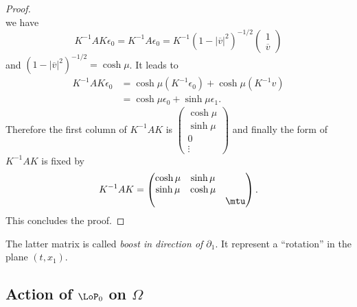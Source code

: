 \begin{proof}
\[\]
we have 
\[ 
  K^{-1}AK\epsilon_0=K^{-1}A\epsilon_0=K^{-1}(1-|\overline{v}|^2)^{-1/2}
\begin{pmatrix}
1\\\overline{v}
\end{pmatrix}
\]
and $(1-|\overline{v}|^2)^{-1/2}=\cosh\mu$. It leads to
\[ 
\begin{split}
K^{-1}AK\epsilon_0&=\cosh\mu(K^{-1}\epsilon_0)+\cosh\mu(K^{-1}v)\\
		&=\cosh\mu\epsilon_0+\sinh\mu\epsilon_1.
\end{split}  
\]
Therefore the first column of $K^{-1}AK$ is 
$
\begin{pmatrix}
\cosh\mu\\\sinh\mu\\0\\\vdots
\end{pmatrix}
$ and finally the form of $K^{-1}AK$ is fixed by
\[ 
  K^{-1}AK=
\begin{pmatrix}
\cosh\mu&\sinh\mu\\\sinh\mu&\cosh\mu\\&&\mtu
\end{pmatrix}.
\]
This concludes the proof.

\end{proof}
The latter matrix is called \emph{boost in direction of $\partial_1$}. It represent a ``rotation'' in the plane $(t,x_1)$.

\subsection{Action of \texorpdfstring{$\LoP_0$}{L0} on \texorpdfstring{$\Omega$}{O}}

